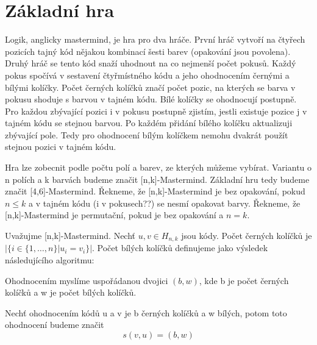 \chapter{Základní hra}
Logik, anglicky mastermind, je hra pro dva hráče. První hráč vytvoří na čtyřech pozicích tajný kód nějakou kombinací šesti barev (opakování jsou povolena). Druhý hráč se tento kód snaží uhodnout na co nejmenší počet pokusů. Každý pokus spočívá v sestavení čtyřmístného kódu a jeho ohodnocením černými a bílými kolíčky. Počet černých kolíčků značí počet pozic, na kterých se barva v pokusu shoduje s barvou v tajném kódu. Bílé kolíčky se ohodnocují postupně. Pro každou zbývající pozici i v pokusu postupně zjistím, jestli existuje pozice j v tajném kódu se stejnou barvou. Po každém přidání bílého kolíčku aktualizuji zbývající pole. Tedy pro ohodnocení bílým kolíčkem nemohu dvakrát použít stejnou pozici v tajném kódu.

Hra lze zobecnit podle počtu polí a barev, ze kterých můžeme vybírat. Variantu o n polích a k barvách budeme značit [n,k]-Mastermind. Základní hru tedy budeme značit [4,6]-Mastermind. Řekneme, že [n,k]-Mastermind je bez opakování, pokud $n \leq k$ a v tajném kódu (i v pokusech??) se nesmí opakovat barvy. Řekneme, že [n,k]-Mastermind je permutační, pokud je bez opakování a $n = k$.

\begin{definice}[ohodnocení]\label{def01:2}
  Uvažujme [n,k]-Mastermind. Nechť $u,v \in H_{n,k}$ jsou kódy. 
  Počet černých kolíčků je $|\{i \in \{1,\dots, n\}|  u_i = v_i \} |$.
  Počet bílých kolíčků definujeme jako výsledek následujícího algoritmu:

  
  
  Ohodnocením myslíme uspořádanou dvojici $(b,w)$, kde b je počet černých kolíčků a w je počet bílých kolíčků.
  
  Nechť ohodnocením kódů u a v je b černých kolíčků a w bílých, potom toto ohodnocení budeme značit \[s(v, u) = (b,w) \]
\end{definice}

